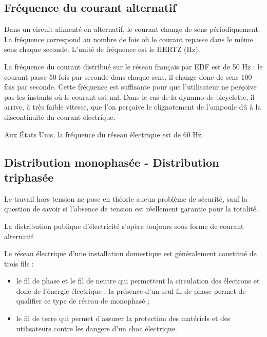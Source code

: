 \subsection{Fréquence du courant alternatif}

Dans un circuit alimenté en alternatif, le courant change de sens périodiquement. La fréquence correspond au nombre de fois où le courant repasse dans le même sens chaque seconde. L’unité de fréquence est le HERTZ (Hz).
\vspace{0.3cm}

La fréquence du courant distribué sur le réseau français par EDF est de 50 Hz : le courant passe 50 fois par seconde dans chaque sens, il change donc de sens 100 fois par seconde. Cette fréquence est suffisante pour que l’utilisateur ne perçoive pas les instants où le courant est nul. Dans le cas de la dynamo de bicyclette, il arrive, à très faible vitesse, que l’on perçoive le clignotement de l’ampoule dû à la discontinuité du courant électrique.
\vspace{0.3cm}

Aux États Unis, la fréquence du réseau électrique est de 60 Hz.



\subsection{Distribution monophasée - Distribution triphasée}

Le travail hors tension ne pose en théorie aucun problème de sécurité, sauf la question de savoir si l’absence de tension est réellement garantie pour la totalité.
\vspace{0.3cm}


La distribution publique d’électricité s’opère toujours sous forme de courant alternatif.
\vspace{0.3cm}

Le réseau électrique d’une installation domestique est généralement constitué de trois fils :

\begin{itemize}

\item le fil de phase et le fil de neutre qui permettent la circulation des électrons et donc de l’énergie électrique ; la présence d’un seul fil de phase permet de qualifier ce type de réseau de monophasé ;
\item le fil de terre qui permet d’assurer la protection des matériels et des utilisateurs contre les dangers d’un choc électrique.

\end{itemize}

